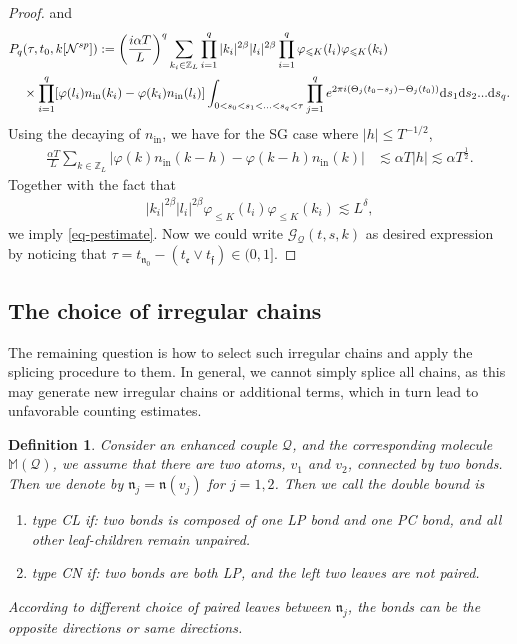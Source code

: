 \documentclass[UTF-8,reqno]{amsart}
\numberwithin{equation}{section}
\newtheorem{definition}[theorem]{Definition}
\theoremstyle{definition}
\def\dif{{\mathord{{\rm d}}}}
\def\leq{\leqslant}
\def\dif{{\mathord{{\rm d}}}}
\def\leq{\leqslant}
\begin{document}
\begin{proof}
  and
    \begin{align}\label{bd:irre:cancel}
    P_q&(\tau, t_0, k[\mathcal N^{sp}]) :=\bigg(\frac{i\alpha T}{L}\bigg)^q\sum\limits_{k_i \in \mathbb{Z}_L} %
    \prod_{i=1}^q |k_i|^{2\beta}|l_i|^{2\beta}\prod_{i=1}^q \varphi_{\leq K}({l_i})\varphi_{\leq K}({k_i}) \notag\\
     &\times\prod_{i = 1}^q [\varphi(l_i)n_{\rm in}(k_i)-\varphi(k_i)n_{\rm in}(l_i)]
\int_{0<s_0 <s_1< \ldots < s_q < \tau} \prod_{j = 1}^q e^{2\pi i(  \Theta_{j}(t_0-s_{j})-\Theta_j(t_{0}))} \dif s_1\dif s_2...\dif s_q.
    \end{align}
    Using the  decaying  of $  n_{\mathrm{in}}$,   we have for the SG case where $|h|\leq T^{-1/2}$,
    \begin{align*}
    \frac{\alpha T}{L} \sum_{k \in \mathbb{Z}_L} \left| \varphi(k)n_{\mathrm{in}}(k - h)-\varphi(k-h)n_{\mathrm{in}}(k)\right| &\lesssim \alpha  T |h| \lesssim \alpha T^{\frac{1}{2}}.
    \end{align*}
 Together with the fact that
    \begin{align*}
        |k_i|^{2\beta}|l_i|^{2\beta} \varphi_{\leq K}({l_i})\varphi_{\leq K}({k_i})\lesssim L^{\delta}, 
    \end{align*} we imply \eqref{eq-pestimate}. 
   Now we could write $ \mathcal{G}_\mathcal{Q}(t,s,k)$ as desired expression by noticing that $\tau=t_{\mathfrak{n}_0}-(t_{\mathfrak e}\vee t_{\mathfrak f} )\in(0,1]$. 
    \end{proof}



\subsection{The choice of irregular chains}\label{sec:choicechain}
The remaining question is how to select such irregular chains and apply the splicing procedure to them. In general, we cannot simply splice all chains, as this may generate new irregular chains or additional terms, which in turn lead to unfavorable counting estimates. 
\begin{definition}\label{def:doublebond}
Consider  an enhanced couple $\mathcal{Q}$, and the corresponding molecule $\mathbb{M}(\mathcal{Q})$, we assume that there are two atoms, $v_1$ and $v_2$, connected by  two bonds. Then we denote by $\mathfrak{n}_j = \mathfrak{n}(v_j)$ for $j=1,2$.  Then we call the double bound is 

\begin{enumerate} 
\item type CL if: two  bonds is composed of one LP bond and one PC bond, and all other leaf-children  remain unpaired.
\item type CN if: two bonds are  both   LP, and the left two leaves are not paired.
\end{enumerate}
According to different choice of paired leaves between $\mathfrak{n}_j$, the bonds can be the opposite directions or same directions.
\end{definition}
\end{document}
